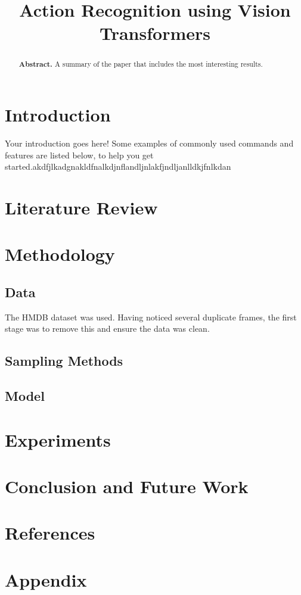 \documentclass[twocolumn,showpacs,%
  nofootinbib,aps,superscriptaddress,%
  eqsecnum,prd,notitlepage,showkeys,10pt]{IEEEtran}
\begin{document}
\title{Action Recognition using Vision Transformers}
\author{
}
\maketitle

\begin{abstract}
\textbf{Abstract.} A summary of the paper that includes the most interesting results.
\end{abstract}

\section{Introduction}

Your introduction goes here! Some examples of commonly used commands and features are listed below, to help you get started.akdfjlkadgnakldfnalkdjnflandljnlakfjndljanlldkjfnlkdan


\section{Literature Review}



\section{Methodology}
\subsection{Data}
The HMDB dataset was used. Having noticed several duplicate frames, the first stage was to remove this and ensure the data was clean. 

\subsection{Sampling Methods}
\subsection{Model}


\section{Experiments}




\section{Conclusion and Future Work}


\section{References}

\section{Appendix}
\end{document}
